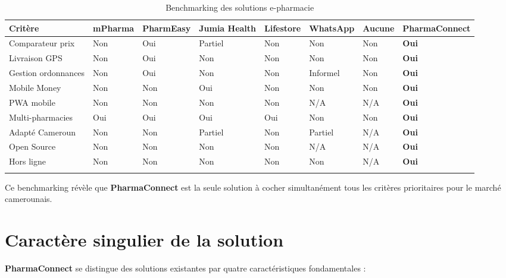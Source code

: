 \documentclass[12pt,a4paper,oneside]{report}
\newcommand{\pharma}{\textcolor{vertpharma}{\textbf{PharmaConnect}}}
\begin{document}
\begin{longtable}{L{2.2cm}L{1.8cm}L{1.8cm}L{1.5cm}L{1.5cm}L{1.5cm}L{1.5cm}L{2cm}}
  \toprule
  \textbf{Critère} & \textbf{mPharma} & \textbf{PharmEasy} & \textbf{Jumia Health} & \textbf{Lifestore} & \textbf{WhatsApp} & \textbf{Aucune} & \textbf{PharmaConnect} \\
  \midrule
  Comparateur prix & Non & Oui & Partiel & Non & Non & Non & \textbf{Oui} \\
  Livraison GPS & Non & Oui & Non & Non & Non & Non & \textbf{Oui} \\
  Gestion ordonnances & Non & Oui & Non & Non & Informel & Non & \textbf{Oui} \\
  Mobile Money & Non & Non & Oui & Non & Non & Non & \textbf{Oui} \\
  PWA mobile & Non & Non & Non & Non & N/A & N/A & \textbf{Oui} \\
  Multi-pharmacies & Oui & Oui & Oui & Oui & Non & Non & \textbf{Oui} \\
  Adapté Cameroun & Non & Non & Partiel & Non & Partiel & N/A & \textbf{Oui} \\
  Open Source & Non & Non & Non & Non & N/A & N/A & \textbf{Oui} \\
  Hors ligne & Non & Non & Non & Non & Non & N/A & \textbf{Oui} \\
  \bottomrule
  \caption{Benchmarking des solutions e-pharmacie}
\end{longtable}

Ce benchmarking révèle que \pharma{} est la seule solution à cocher simultanément tous les critères prioritaires pour le marché camerounais.

\section{Caractère singulier de la solution}

\pharma{} se distingue des solutions existantes par quatre caractéristiques fondamentales :
\end{document}
